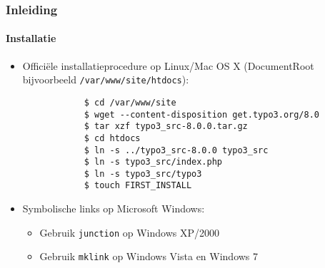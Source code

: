 \begin{frame}[fragile]
	\frametitle{Inleiding}
	\framesubtitle{Installatie}

	\begin{itemize}
		\item Officiële installatieprocedure op Linux/Mac OS X\newline
			(DocumentRoot bijvoorbeeld \texttt{/var/www/site/htdocs}):
		\begin{lstlisting}
			$ cd /var/www/site
			$ wget --content-disposition get.typo3.org/8.0
			$ tar xzf typo3_src-8.0.0.tar.gz
			$ cd htdocs
			$ ln -s ../typo3_src-8.0.0 typo3_src
			$ ln -s typo3_src/index.php
			$ ln -s typo3_src/typo3
			$ touch FIRST_INSTALL
		\end{lstlisting}

		\item Symbolische links op Microsoft Windows:

			\begin{itemize}
				\item Gebruik \texttt{junction} op Windows XP/2000
				\item Gebruik \texttt{mklink} op Windows Vista en Windows 7
			\end{itemize}

	\end{itemize}
\end{frame}

